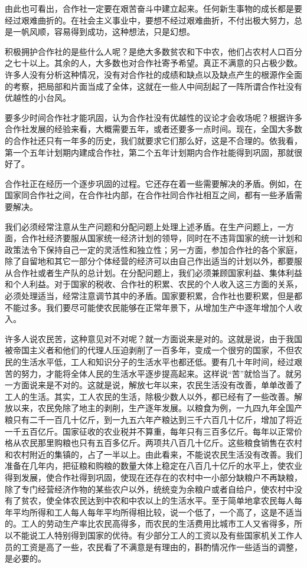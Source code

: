 由此也可看出，合作社一定要在艰苦奋斗中建立起来。任何新生事物的成长都是要经过艰难曲折的。在社会主义事业中，要想不经过艰难曲折，不付出极大努力，总是一帆风顺，容易得到成功，这种想法，只是幻想。

积极拥护合作社的是些什么人呢？是绝大多数贫农和下中农，他们占农村人口百分之七十以上。其余的人，大多数也对合作社寄予希望。真正不满意的只占极少数。许多人没有分析这种情况，没有对合作社的成绩和缺点以及缺点产生的根源作全面的考察，把局部和片面当成了全体，这就在一些人中间刮起了一阵所谓合作社没有优越性的小台风。

要多少时间合作社才能巩固，认为合作社没有优越性的议论才会收场呢？根据许多合作社发展的经验来看，大概需要五年，或者还要多一点时间。现在，全国大多数的合作社还只有一年多的历史，我们就要求它们那么好，这是不合理的。依我看，第一个五年计划期内建成合作社，第二个五年计划期内合作社能得到巩固，那就很好了。

合作社正在经历一个逐步巩固的过程。它还存在着一些需要解决的矛盾。例如，在国家同合作社之间，在合作社内部，在合作社同合作社相互之间，都有一些矛盾需要解决。

我们必须经常注意从生产问题和分配问题上处理上述矛盾。在生产问题上，一方面，合作社经济要服从国家统一经济计划的领导，同时在不违背国家的统一计划和政策法令下保持自己一定的灵活性和独立性；另一方面，参加合作社的各个家庭，除了自留地和其它一部分个体经营的经济可以由自己作出适当的计划以外，都要服从合作社或者生产队的总计划。在分配问题上，我们必须兼顾国家利益、集体利益和个人利益。对于国家的税收、合作社的积累、农民的个人收入这三方面的关系，必须处理适当，经常注意调节其中的矛盾。国家要积累，合作社也要积累，但是都不能过多。我们要尽可能使农民能够在正常年景下，从增加生产中逐年增加个人收入。

许多人说农民苦，这种意见对不对呢？就一方面说来是对的。这就是说，由于我国被帝国主义者和他们的代理人压迫剥削了一百多年，变成一个很穷的国家，不但农民的生活水平低，工人和知识分子的生活水平也都还低。要有几十年时间，经过艰苦的努力，才能将全体人民的生活水平逐步提高起来。这样说“苦”就恰当了。就另一方面说来是不对的。这就是说，解放七年以来，农民生活没有改善，单单改善了工人的生活。其实，工人农民的生活，除极少数人以外，都已经有了一些改善。解放以来，农民免除了地主的剥削，生产逐年发展。以粮食为例，一九四九年全国产粮只有二千一百几十亿斤，到一九五六年产粮达到三千六百几十亿斤，增加了将近一千五百亿斤。国家征收的农业税并不算重，每年只有三百多亿斤。每年以正常价格从农民那里购粮也只有五百多亿斤。两项共八百几十亿斤。这些粮食销售在农村和农村附近的集镇的，占了一半以上。由此看来，不能说农民生活没有改善。我们准备在几年内，把征粮和购粮的数量大体上稳定在八百几十亿斤的水平上，使农业得到发展，使合作社得到巩固，使现在还存在的农村中一小部分缺粮户不再缺粮，除了专门经营经济作物的某些农户以外，统统变为余粮户或者自给户，使农村中没有了贫农，使全体农民达到中农和中农以上的生活水平。至于简单地拿农民每人每年平均所得和工人每人每年平均所得相比较，说一个低了，一个高了，这是不适当的。工人的劳动生产率比农民高得多，而农民的生活费用比城市工人又省得多，所以不能说工人特别得到国家的优待。有少部分工人的工资以及有些国家机关工作人员的工资是高了一些，农民看了不满意是有理由的，斟酌情况作一些适当的调整，是必要的。

